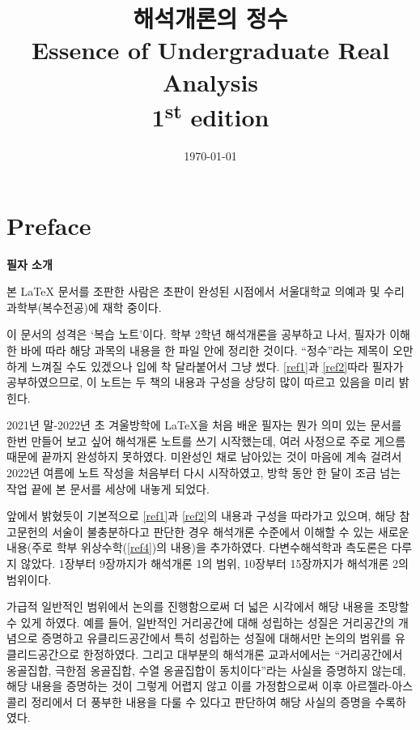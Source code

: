 \documentclass[11pt]{book}
\title{{\huge\bfseries 해석개론의 정수\\
Essence of Undergraduate Real Analysis}\\
{\LARGE\bfseries 1\textsuperscript{st} edition}}
\author{}
\date{{\LARGE \today}}
\numberwithin{equation}{chapter}
\theoremstyle{definition}
\begin{document}
\maketitle

\chapter*{Preface}

{\large\bfseries 필자 소개}

본 {\LaTeX} 문서를 조판한 사람은 초판이 완성된 시점에서 서울대학교 의예과 및 수리과학부(복수전공)에 재학 중이다.


이 문서의 성격은 `복습 노트'이다. 학부 2학년 해석개론을 공부하고 나서, 필자가 이해한 바에 따라 해당 과목의 내용을 한 파일 안에 정리한 것이다. ``정수''라는 제목이 오만하게 느껴질 수도 있겠으나 입에 착 달라붙어서 그냥 썼다. \ref{ref1}과 \ref{ref2}\를 따라 필자가 공부하였으므로, 이 노트는 두 책의 내용과 구성을 상당히 많이 따르고 있음을 미리 밝힌다.


2021년 말-2022년 초 겨울방학에 {\LaTeX}을 처음 배운 필자는 뭔가 의미 있는 문서를 한번 만들어 보고 싶어 해석개론 노트를 쓰기 시작했는데, 여러 사정으로 {\textendash} 주로 게으름 때문에 {\textendash} 끝까지 완성하지 못하였다. 미완성인 채로 남아있는 것이 마음에 계속 걸려서 2022년 여름에 노트 작성을 처음부터 다시 시작하였고, 방학 동안 한 달이 조금 넘는 작업 끝에 본 문서를 세상에 내놓게 되었다.


앞에서 밝혔듯이 기본적으로 \ref{ref1}과 \ref{ref2}의 내용과 구성을 따라가고 있으며, 해당 참고문헌의 서술이 불충분하다고 판단한 경우 해석개론 수준에서 이해할 수 있는 새로운 내용(주로 학부 위상수학(\ref{ref4})의 내용)을 추가하였다. 다변수해석학과 측도론은 다루지 않았다. 1장부터 9장까지가 해석개론 1의 범위, 10장부터 15장까지가 해석개론 2의 범위이다.


가급적 일반적인 범위에서 논의를 진행함으로써 더 넓은 시각에서 해당 내용을 조망할 수 있게 하였다. 예를 들어, 일반적인 거리공간에 대해 성립하는 성질은 거리공간의 개념으로 증명하고 유클리드공간에서 특히 성립하는 성질에 대해서만 논의의 범위를 유클리드공간으로 한정하였다. 그리고 대부분의 해석개론 교과서에서는 ``거리공간에서 옹골집합, 극한점 옹골집합, 수열 옹골집합이 동치이다''라는 사실을 증명하지 않는데, 해당 내용을 증명하는 것이 그렇게 어렵지 않고 이를 가정함으로써 이후 아르젤라-아스콜리 정리에서 더 풍부한 내용을 다룰 수 있다고 판단하여 해당 사실의 증명을 수록하였다.
\end{document}
